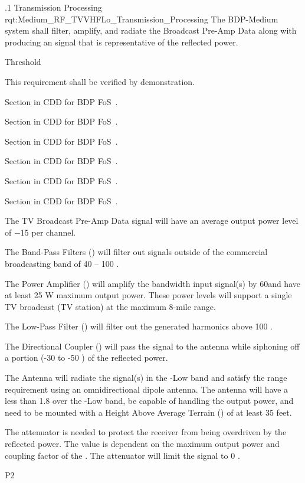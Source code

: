 
\ONERQMTV
{\RqtNumberBase.1}
{\ThisSubSegment Transmission Processing}
{rqt:Medium_RF_TVVHFLo_Transmission_Processing}
{The BDP-Medium system shall filter, amplify, and radiate the \TVVHFLow \RF Broadcast Pre-Amp Data along with producing an \RF signal that is representative of the reflected \RF power.}
{
	\item [Phase 1]  Threshold
}
{This requirement shall be verified by demonstration.}
{
	\item [5.1.1] Section in CDD for BDP FoS~\cite{ref__BDP_FOS_CDD}.
	\item [5.1.2] Section in CDD for BDP FoS~\cite{ref__BDP_FOS_CDD}.
	\item [5.1.4] Section in CDD for BDP FoS~\cite{ref__BDP_FOS_CDD}.
	\item [5.5.1] Section in CDD for BDP FoS~\cite{ref__BDP_FOS_CDD}.
	\item [5.5.3] Section in CDD for BDP FoS~\cite{ref__BDP_FOS_CDD}.
	\item [5.5.4] Section in CDD for BDP FoS~\cite{ref__BDP_FOS_CDD}.
}
{
	\item The TV \RF Broadcast Pre-Amp Data signal will have an average output power level of −15 \dBm per \RF channel.
	\item The Band-Pass Filters (\BPF) will filter out signals outside of the commercial \FM broadcasting band of 40 – 100 \MHz.
	\item The \RF Power Amplifier (\PA) will amplify the \TVVHFLow bandwidth input signal(s) by 60\dB and have at least 25 W maximum output power. These power levels will support a single TV broadcast (TV station) at the maximum 8-mile range.
	\item The Low-Pass Filter (\LPF) will filter out the generated harmonics above 100 \MHz.
	\item The Directional Coupler (\DC) will pass the \RF signal to the antenna while siphoning off a portion (-30 to -50 \dB) of the reflected power.
	\item The Antenna will radiate the \RF signal(s) in the \VHF-Low band and satisfy the range requirement using an omnidirectional dipole antenna. The antenna will have a \VSWR less than 1.8 over the \VHF-Low band, be capable of handling the \PA output power, and need to be mounted with a Height Above Average Terrain (\HAAT) of at least 35 feet.
	\item The attenuator is needed to protect the receiver from being overdriven by the reflected power. The value is dependent on the maximum \PA output power and coupling factor of the \DC. The attenuator will limit the signal to 0 \dBm.
}
{P2}

